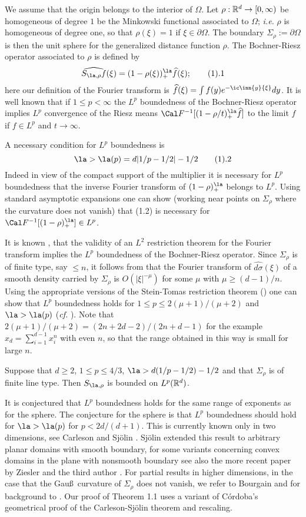 We assume that the origin belongs to the interior of $\Omega$. Let $\rho:\Bbb R^d\to [0,\infty)$ be homogeneous of degree $1$
be the Minkowski functional associated to $\Omega$; {\it i.e.}  $\rho$ is 
homogeneous of degree one, so that $\rho(\xi)=1$ if $\xi\in\partial \Omega$.
The boundary 
$\Sigma_\rho:=\partial \Omega$ is then the  unit sphere for the generalized
distance function $\rho$.
The Bochner-Riesz operator associated to  $\rho$ is defined by
$$
\widehat{S_{\la,\rho}f}(\xi)=
(1-\rho(\xi))^\la_+
\widehat f(\xi);\tag 1.1
$$
here our definition of the Fourier transform is
$\widehat f(\xi)=\int f(y)e^{-\ic\inn{y}{\xi}} dy$.
It is well known that if $1\le p<\infty$ the  $L^p$ boundedness of the Bochner-Riesz operator 
implies $L^p$ convergence of the Riesz means
$\Cal F^{-1}[(1-\rho/t)^\la_+\widehat f]$
to the limit $f$ if $f\in L^p$ and $t\to\infty$.

A necessary condition for $L^p$ boundedness is
$$\la>\la(p)=d|1/p-1/2|-1/2
\tag 1.2$$
Indeed in view of the compact support of the multiplier 
it is necessary for $L^p$ boundedness that the inverse Fourier transform of 
$(1-\rho)^\la_+$ belongs to $L^p$. Using standard asymptotic expansions
one can show (working near points on $\Sigma_\rho$ where the 
curvature  does not vanish) that (1.2) is necessary for 
$\Cal F^{-1}[(1-\rho)^\la_+]\in L^p$.

It is known \cite{9}, \cite{29} that the validity of an $L^2$ restriction  theorem 
 for the 
Fourier transform
implies the $L^p$ boundedness of the Bochner-Riesz operator.
 Since $\Sigma_\rho$ is of finite type, 
say $\le n$, it follows from \cite{3} that the Fourier transform of
$\widehat{d\sigma}(\xi) $ of a smooth density carried by  $\Sigma_\rho$ is
$O(|\xi|^{-\mu})$ for some $\mu$ with  $\mu\ge (d-1)/n$.
Using  the appropriate versions of the
 Stein-Tomas restriction theorem (\cite{10}) one can show that
 $L^p$ boundedness holds for
 $1\le p\le 2(\mu+1)/(\mu+2)$ and $\la>\la(p)$ ({\it cf.} \cite{29}). Note that
$2(\mu+1)/(\mu+2)=(2n+2d-2)/(2n+d-1)$ for the 
example $x_d=\sum_{i=1}^{d-1} x_i^n$ with even $n$, so that the range obtained in this 
way is small for large $n$.

 Suppose that
$d\ge 2$, $1\le p\le 4/3$, $\la>d(1/p-1/2)-1/2$  and that
 $\Sigma_\rho$ is of finite line type. Then $S_{\la,\rho}$ is 
bounded on $L^p(\Bbb R^d)$.
\endproclaim


It is conjectured that $L^p$ boundedness holds for the same range of exponents
as for the sphere.
The conjecture for the sphere is that $L^p$ boundedness should hold
for $\la>\la(p)$ for 
$p<2d/(d+1)$. This is currently known only in two dimensions,
see Carleson and Sj\"olin
\cite{4}.
Sj\"olin \cite{28} extended this result  to arbitrary planar domains with
 smooth boundary, for some 
 variants concerning convex  domains in the plane 
 with nonsmooth boundary see also the more  recent paper by Ziesler and the 
third author \cite{27}. 
For partial results 
in higher dimensions, in the case that the 
 Gau\ss \ curvature of $\Sigma_\rho$ 
does not vanish,
we refer to Bourgain \cite{1} and for background to
\cite{29}. Our proof of  Theorem 1.1  uses a variant of C\'ordoba's 
 geometrical proof \cite{6} of the Carleson-Sj\"olin theorem and rescaling.


